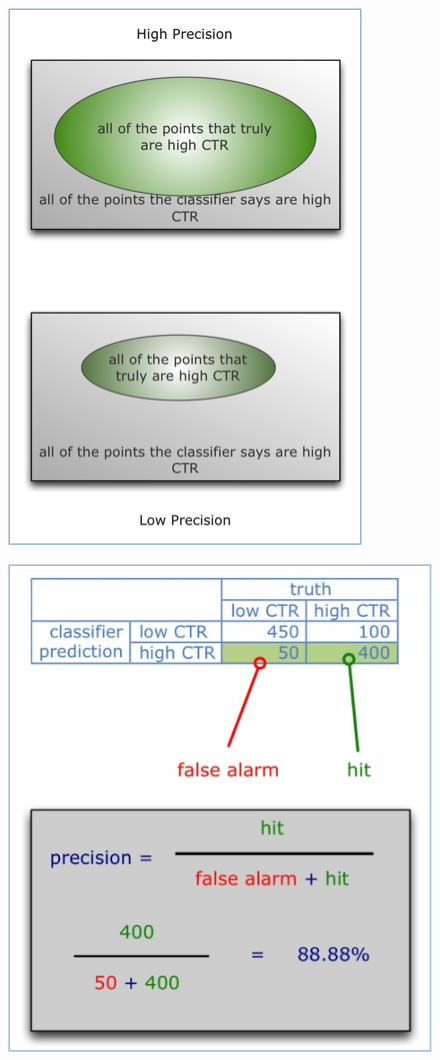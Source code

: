 
\begin{figure}
\centering
\begin{minipage}{.5\textwidth}
  \centering
  \includegraphics[width=.7\linewidth]{img/testclass/6.png}
  \label{fig:test1}
\end{minipage}%
\begin{minipage}{.5\textwidth}
  \centering
  \includegraphics[width=.9\linewidth]{img/testclass/7.png}
  \label{fig:test2}
\end{minipage}
\end{figure}

